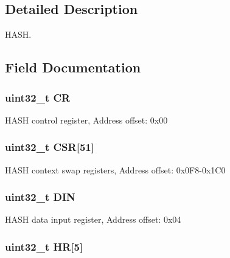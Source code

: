 \subsection{Detailed Description}
H\-A\-S\-H. 

\subsection{Field Documentation}
\hypertarget{struct_h_a_s_h___type_def_ab40c89c59391aaa9d9a8ec011dd0907a}{
\subsubsection[{C\-R}]{ uint32\-\_\-t C\-R}}\label{struct_h_a_s_h___type_def_ab40c89c59391aaa9d9a8ec011dd0907a}
H\-A\-S\-H control register, Address offset\-: 0x00 \hypertarget{struct_h_a_s_h___type_def_a5a72a62805d5497f2b44448edd18f20f}{
\subsubsection[{C\-S\-R}]{ uint32\-\_\-t C\-S\-R\mbox{[}51\mbox{]}}}\label{struct_h_a_s_h___type_def_a5a72a62805d5497f2b44448edd18f20f}
H\-A\-S\-H context swap registers, Address offset\-: 0x0\-F8-\/0x1\-C0 \hypertarget{struct_h_a_s_h___type_def_a445dd5529e7dc6a4fa2fec4f78da2692}{
\subsubsection[{D\-I\-N}]{ uint32\-\_\-t D\-I\-N}}\label{struct_h_a_s_h___type_def_a445dd5529e7dc6a4fa2fec4f78da2692}
H\-A\-S\-H data input register, Address offset\-: 0x04 \hypertarget{struct_h_a_s_h___type_def_a02cdb629fbb2bfa63db818ac846847a1}{
\subsubsection[{H\-R}]{ uint32\-\_\-t H\-R\mbox{[}5\mbox{]}}}\label{struct_h_a_s_h___type_def_a02cdb629fbb2bfa63db818ac846847a1}
